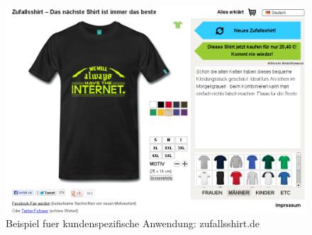 \begin{frame}
    \begin{figure}
        \includegraphics[height=0.8\textheight]{resources/zufallsshirt}
        \caption{Beispiel fuer kundenspezifische Anwendung: zufallsshirt.de}
    \end{figure}
\end{frame}

